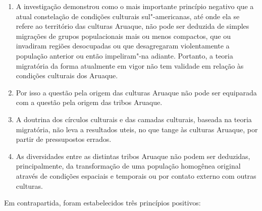 \begin{enumerate}
\def\labelenumi{\arabic{enumi}.}
\item
  A investigação demonstrou como o mais importante princípio negativo
  que a atual constelação de condições culturais sul"-americanas, até
  onde ela se refere ao território das culturas Aruaque, não pode ser
  deduzida de simples migrações de grupos populacionais mais ou menos
  compactos, que ou invadiram regiões desocupadas ou que desagregaram
  violentamente a população anterior ou então impeliram"-na adiante.
  Portanto, a teoria migratória da forma atualmente em vigor não tem
  validade em relação às condições culturais dos Aruaque.
\item
  Por isso a questão pela origem das culturas Aruaque não pode ser
  equiparada com a questão pela origem das tribos Aruaque.
\item
  A doutrina dos círculos culturais e das camadas culturais, baseada na
  teoria migratória, não leva a resultados uteis, no que tange às
  culturas Aruaque, por partir de pressupostos errados.
\item
  As diversidades entre as distintas tribos Aruaque não podem ser
  deduzidas, principalmente, da transformação de uma população
  homogênea original através de condições espaciais e temporais ou por
  contato externo com outras culturas.
\end{enumerate}

Em contrapartida, foram estabelecidos três princípios positivos:

